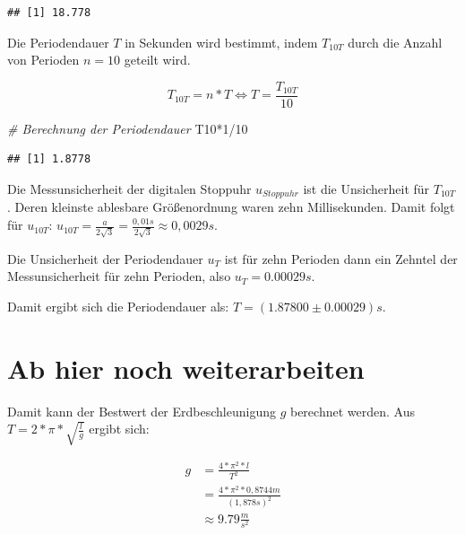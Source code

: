 \documentclass[
  9pt,
]{article}
\newenvironment{Shaded}{\begin{snugshade}}{\end{snugshade}}
\newcommand{\CommentTok}[1]{\textcolor[rgb]{0.56,0.35,0.01}{\textit{#1}}}
\newcommand{\DecValTok}[1]{\textcolor[rgb]{0.00,0.00,0.81}{#1}}
\newcommand{\NormalTok}[1]{#1}
\newcommand{\SpecialCharTok}[1]{\textcolor[rgb]{0.00,0.00,0.00}{#1}}
\begin{document}
\begin{verbatim}
## [1] 18.778
\end{verbatim}

Die Periodendauer \(T\) in Sekunden wird bestimmt, indem \(T_{10T}\)
durch die Anzahl von Perioden \(n=10\) geteilt wird.

\begin{equation}\label{Pendel:T}
T_{10T} = n*T \Leftrightarrow T = \frac{T_{10T}}{10}
\end{equation}

\begin{Shaded}
\begin{Highlighting}[]
\CommentTok{\# Berechnung der Periodendauer}
\NormalTok{T10}\SpecialCharTok{*}\DecValTok{1}\SpecialCharTok{/}\DecValTok{10}
\end{Highlighting}
\end{Shaded}

\begin{verbatim}
## [1] 1.8778
\end{verbatim}

Die Messunsicherheit der digitalen Stoppuhr \(u_{Stoppuhr}\) ist die
Unsicherheit für \(T_{10T}\). Deren kleinste ablesbare Größenordnung
waren zehn Millisekunden. Damit folgt für \(u_{10T}\):
\(u_{10T}= \frac{a}{2\sqrt{3}} = \frac{0,01s}{2\sqrt{3}} \approx 0,0029s\).

Die Unsicherheit der Periodendauer \(u_T\) ist für zehn Perioden dann
ein Zehntel der Messunsicherheit für zehn Perioden, also
\(u_T=0.00029s\).

Damit ergibt sich die Periodendauer als: \(T=(1.87800 \pm 0.00029)s\).

\hypertarget{ab-hier-noch-weiterarbeiten}{%
\section{Ab hier noch
weiterarbeiten}\label{ab-hier-noch-weiterarbeiten}}

Damit kann der Bestwert der Erdbeschleunigung \(g\) berechnet werden.
Aus \(T=2*\pi*\sqrt{\frac{l}{g}}\) ergibt sich:

\begin{equation*}
\begin{split}
g&=\frac{4*\pi^2*l}{T^2}\\
 &=\frac{4*\pi^2*0,8744m}{(1,878s)^2}\\
 &\approx 9.79 \frac{m}{s^2} 
\end{split}
\end{equation*}
\end{document}
